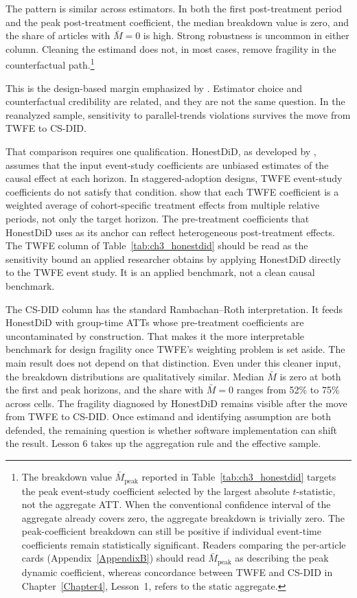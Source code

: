The pattern is similar across estimators. In both the first post-treatment period and the peak post-treatment coefficient, the median breakdown value is zero, and the share of articles with $\bar M = 0$ is high. Strong robustness is uncommon in either column. Cleaning the estimand does not, in most cases, remove fragility in the counterfactual path.\footnote{The breakdown value $\bar{M}_{\text{peak}}$ reported in Table~\ref{tab:ch3_honestdid} targets the peak event-study coefficient selected by the largest absolute $t$-statistic, not the aggregate ATT. When the conventional confidence interval of the aggregate already covers zero, the aggregate breakdown is trivially zero. The peak-coefficient breakdown can still be positive if individual event-time coefficients remain statistically significant. Readers comparing the per-article cards (Appendix~\ref{AppendixB}) should read $\bar{M}_{\text{peak}}$ as describing the peak dynamic coefficient, whereas concordance between TWFE and CS-DID in Chapter~\ref{Chapter4}, Lesson~1, refers to the static aggregate.}

This is the design-based margin emphasized by \textcite{baker2025difference}. Estimator choice and counterfactual credibility are related, and they are not the same question. In the reanalyzed sample, sensitivity to parallel-trends violations survives the move from TWFE to CS-DID.

That comparison requires one qualification. HonestDiD, as developed by \textcite{rambachan2023more}, assumes that the input event-study coefficients are unbiased estimates of the causal effect at each horizon. In staggered-adoption designs, TWFE event-study coefficients do not satisfy that condition. \textcite{sun2021estimating} show that each TWFE coefficient is a weighted average of cohort-specific treatment effects from multiple relative periods, not only the target horizon. The pre-treatment coefficients that HonestDiD uses as its anchor can reflect heterogeneous post-treatment effects. The TWFE column of Table~\ref{tab:ch3_honestdid} should be read as the sensitivity bound an applied researcher obtains by applying HonestDiD directly to the TWFE event study. It is an applied benchmark, not a clean causal benchmark.

The CS-DID column has the standard Rambachan--Roth interpretation. It feeds HonestDiD with group-time ATTs whose pre-treatment coefficients are uncontaminated by construction. That makes it the more interpretable benchmark for design fragility once TWFE's weighting problem is set aside. The main result does not depend on that distinction. Even under this cleaner input, the breakdown distributions are qualitatively similar. Median $\bar M$ is zero at both the first and peak horizons, and the share with $\bar M = 0$ ranges from 52\% to 75\% across cells. The fragility diagnosed by HonestDiD remains visible after the move from TWFE to CS-DID. Once estimand and identifying assumption are both defended, the remaining question is whether software implementation can shift the result. Lesson 6 takes up the aggregation rule and the effective sample.

